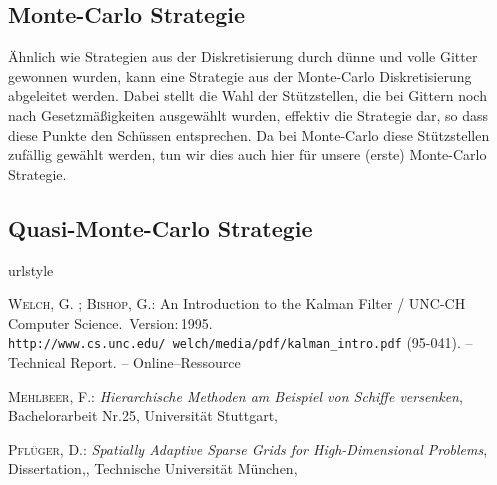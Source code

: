 \documentclass[a4paper,12pt]{llncs}
\numberwithin{equation}{section}
\begin{document}
\subsection{Monte-Carlo Strategie}

Ähnlich wie Strategien aus der Diskretisierung durch dünne und volle Gitter gewonnen wurden, kann eine Strategie aus der Monte-Carlo Diskretisierung abgeleitet werden. Dabei stellt die Wahl der Stützstellen, die bei Gittern noch nach Gesetzmäßigkeiten ausgewählt wurden, effektiv die Strategie dar, so dass diese Punkte den Schüssen entsprechen. Da bei Monte-Carlo diese Stützstellen zufällig gewählt werden, tun wir dies auch hier für unsere (erste) Monte-Carlo Strategie. 

\subsection{Quasi-Monte-Carlo Strategie}


\newpage

% 

\begin{thebibliography}{WB95}
	\providecommand{\url}[1]{\texttt{#1}}
	\expandafter\ifx\csname urlstyle\endcsname\relax
	\providecommand{\doi}[1]{doi: #1}\else
	\providecommand{\doi}{doi: \begingroup \urlstyle{rm}\Url}\fi
	
	\textsc{Welch}, G. ; \textsc{Bishop}, G.:
	\newblock An Introduction to the Kalman Filter  / UNC-CH Computer Science.
	\newblock \,Version:\,1995.
	\newblock  \url{http://www.cs.unc.edu/~welch/media/pdf/kalman_intro.pdf}
	(95-041). --
	\newblock Technical Report. --
	\newblock Online--Ressource
	
	\textsc{Mehlbeer}, F.:
	\newblock \textit{Hierarchische Methoden am Beispiel von Schiffe versenken},
	\newblock Bachelorarbeit Nr.25,
	\newblock Universität Stuttgart,
	
	\textsc{Pflüger}, D.:
	\newblock \textit{Spatially Adaptive Sparse Grids for High-Dimensional Problems},
	\newblock Dissertation,,
	\newblock Technische Universität München,
	
\end{thebibliography}


\end{document}
